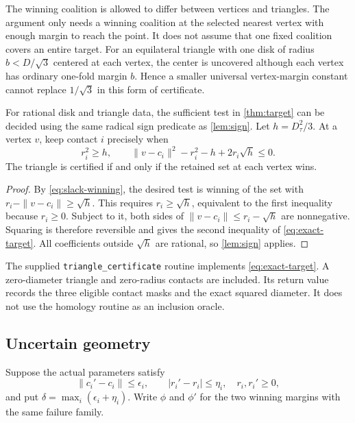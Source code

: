 The winning coalition is allowed to differ between vertices and triangles. The argument only needs a winning coalition at the selected nearest vertex with enough margin to reach the point. It does not assume that one fixed coalition covers an entire target. For an equilateral triangle with one disk of radius $b<D/\sqrt3$ centered at each vertex, the center is uncovered although each vertex has ordinary one-fold margin $b$. Hence a smaller universal vertex-margin constant cannot replace $1/\sqrt3$ in this form of certificate.

\begin{proposition}\label{prop:exact-target}
For rational disk and triangle data, the sufficient test in \cref{thm:target} can be decided using the same radical sign predicate as \cref{lem:sign}. Let $h=D_\tau^2/3$. At a vertex $v$, keep contact $i$ precisely when
\begin{equation}\label{eq:exact-target}
r_i^2\ge h,\qquad
\|v-c_i\|^2-r_i^2-h+2r_i\sqrt h\le0.
\end{equation}
The triangle is certified if and only if the retained set at each vertex wins.
\end{proposition}
\begin{proof}
By \cref{eq:slack-winning}, the desired test is winning of the set with $r_i-\|v-c_i\|\ge\sqrt h$. This requires $r_i\ge\sqrt h$, equivalent to the first inequality because $r_i\ge0$. Subject to it, both sides of $\|v-c_i\|\le r_i-\sqrt h$ are nonnegative. Squaring is therefore reversible and gives the second inequality of \cref{eq:exact-target}. All coefficients outside $\sqrt h$ are rational, so \cref{lem:sign} applies.
\end{proof}

The supplied \texttt{triangle\_certificate} routine implements \cref{eq:exact-target}. A zero-diameter triangle and zero-radius contacts are included. Its return value records the three eligible contact masks and the exact squared diameter. It does not use the homology routine as an inclusion oracle.

\subsection{Uncertain geometry}
Suppose the actual parameters satisfy
\[
\|c_i'-c_i\|\le\epsilon_i,\qquad |r_i'-r_i|\le\eta_i,
\quad r_i,r_i'\ge0,
\]
and put $\delta=\max_i(\epsilon_i+\eta_i)$. Write $\phi$ and $\phi'$ for the two winning margins with the same failure family.

